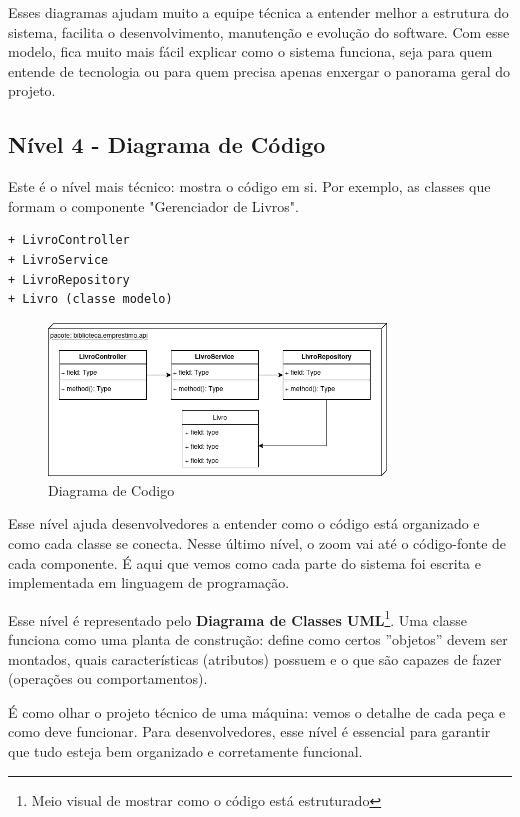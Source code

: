 \documentclass[a4paper,11pt]{article}
\begin{document}
Esses diagramas ajudam muito a equipe técnica a entender melhor a estrutura do sistema, facilita o desenvolvimento, manutenção e evolução do software. Com esse modelo, fica muito mais fácil explicar como o sistema funciona, seja para quem entende de tecnologia ou para quem precisa apenas enxergar o panorama geral do projeto.

\subsection{Nível 4 - Diagrama de Código}
Este é o nível mais técnico: mostra o código em si. Por exemplo, as classes que formam o componente "Gerenciador de Livros".
 \vspace{-1em}
\begin{verbatim}
+ LivroController
+ LivroService
+ LivroRepository
+ Livro (classe modelo)
\end{verbatim}

\begin{figure}[!htb]
\centering
\includegraphics[width=0.8\textwidth]{imagens/Codigo}
\caption{Diagrama de Codigo}
\end{figure}

Esse nível ajuda desenvolvedores a entender como o código está organizado e como cada classe se
conecta. Nesse último nível, o zoom vai até o código-fonte de cada componente. É aqui que vemos como cada parte do sistema foi escrita e implementada em linguagem de programação.

Esse nível é representado pelo \textbf{Diagrama de Classes UML}\footnote{Meio visual de mostrar como o código está estruturado}. Uma classe funciona como uma planta de construção: define como certos ”objetos” devem ser montados, quais características (atributos) possuem e o que são capazes de fazer (operações ou comportamentos).

É como olhar o projeto técnico de uma máquina: vemos o detalhe de cada peça e como deve funcionar. Para desenvolvedores, esse nível é essencial para garantir que tudo esteja bem organizado e corretamente funcional.
\end{document}

